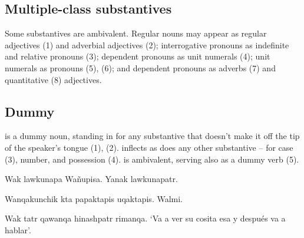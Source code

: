 {\subsection{Multiple-class substantives}\label{sec:mcsub}
Some substantives are ambivalent. Regular nouns may appear as regular adjectives (1) and adverbial adjectives (2); interrogative pronouns as indefinite and relative pronouns (3); dependent pronouns as unit numerals (4); unit numerals as pronouns (5), (6); and dependent pronouns as adverbs (7) and quantitative (8) adjectives.

\begin{example}
\end{example}

\subsection{Dummy }\label{sec:dummyna}
 is a dummy noun, standing in for any substantive that doesn't make it off the tip of the speaker's tongue (1), (2).  inflects as does any other substantive -- for case (3), number, and possession (4).  is ambivalent, serving also as a dummy verb (5).

%
{Wak  lawkunapa  Wa\~nupisa. Yanak lawkunapatr.}%
{}%
{}{}%

%
{Wanqakunchik kta papaktapis uqaktapis. Walmi.}%
{}%
{}{}%

%
{Wak tatr qawanqa hinashpatr rimanqa.}%
{}%
%
{`Va a ver su cosita esa y despu\'es va a hablar'.}%
{}{}%

}
